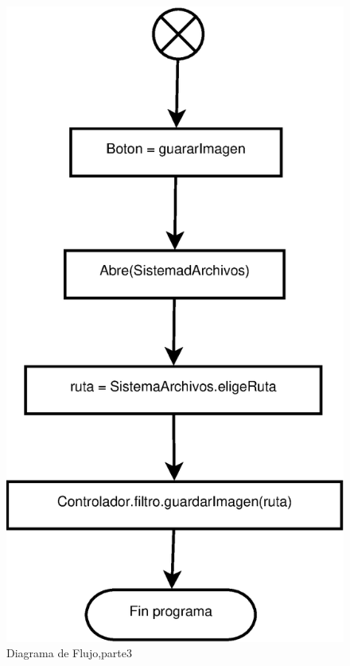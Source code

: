 \documentclass{article}
\begin{document}
\begin{figure}[t]
    \includegraphics[scale=.73]{images/Diagrama3.eps} 
    \caption{Diagrama de Flujo,parte3}
\end{figure}
\end{document}
